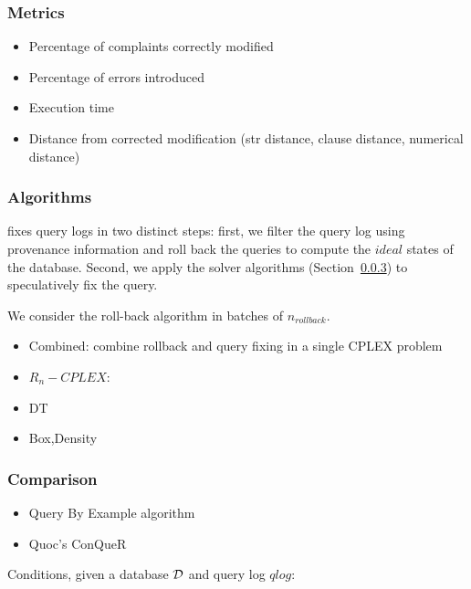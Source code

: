 \subsubsection{Metrics}

\begin{itemize}
\item Percentage of complaints correctly modified
\item Percentage of errors introduced
\item Execution time
\item Distance from corrected modification (str distance, clause distance, numerical distance)
\end{itemize}

\subsubsection{Algorithms}

\sys fixes query logs in two distinct steps: first, we filter the query log using 
provenance information and roll back the queries to compute the $ideal$ states of the database.
Second, we apply the solver algorithms (Section~\ref{}) to speculatively fix the query.

We consider the roll-back algorithm in batches of $n_{rollback}$.

\begin{itemize}
\item Combined:  combine rollback and query fixing in a single CPLEX problem
\item $R_n-CPLEX$: 
\item DT
\item Box,Density
\end{itemize}



\subsubsection{Comparison}

\begin{itemize}
\item Query By Example algorithm
\item Quoc's ConQueR
\end{itemize}

Conditions, given a database ${\cal D}$ and query log $qlog$:


